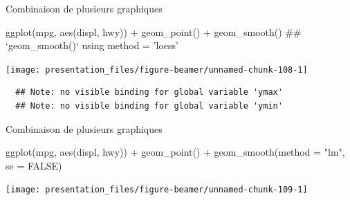 \documentclass[12pt,ignorenonframetext,handout,]{beamer}
\newenvironment{Shaded}{}{}
\newcommand{\DataTypeTok}[1]{#1}
\newcommand{\KeywordTok}[1]{\textcolor[rgb]{0.00,0.00,1.00}{#1}}
\newcommand{\NormalTok}[1]{#1}
\newcommand{\OperatorTok}[1]{#1}
\newcommand{\OtherTok}[1]{\textcolor[rgb]{1.00,0.25,0.00}{#1}}
\newcommand{\StringTok}[1]{\textcolor[rgb]{0.00,0.50,0.50}{#1}}
\renewenvironment{Shaded}{\begin{snugshade}}{\end{snugshade}}
\begin{document}
\begin{frame}[fragile]{Combinaison de plusieurs graphiques}
\protect\hypertarget{combinaison-de-plusieurs-graphiques-2}{}

\footnotesize \center

\begin{Shaded}
\begin{Highlighting}[]
\KeywordTok{ggplot}\NormalTok{(mpg, }\KeywordTok{aes}\NormalTok{(displ, hwy)) }\OperatorTok{+}
\StringTok{  }\KeywordTok{geom_point}\NormalTok{() }\OperatorTok{+}\StringTok{ }\KeywordTok{geom_smooth}\NormalTok{()}
\NormalTok{  ## `geom_smooth()` using method = 'loess'}
\end{Highlighting}
\end{Shaded}

\texttt{[image: presentation\_files/figure-beamer/unnamed-chunk-108-1]}

\begin{verbatim}
  ## Note: no visible binding for global variable 'ymax' 
  ## Note: no visible binding for global variable 'ymin'
\end{verbatim}

\end{frame}

\begin{frame}[fragile]{Combinaison de plusieurs graphiques}
\protect\hypertarget{combinaison-de-plusieurs-graphiques-3}{}

\footnotesize \center

\begin{Shaded}
\begin{Highlighting}[]
\KeywordTok{ggplot}\NormalTok{(mpg, }\KeywordTok{aes}\NormalTok{(displ, hwy)) }\OperatorTok{+}
\StringTok{  }\KeywordTok{geom_point}\NormalTok{() }\OperatorTok{+}\StringTok{ }\KeywordTok{geom_smooth}\NormalTok{(}\DataTypeTok{method =} \StringTok{"lm"}\NormalTok{, }\DataTypeTok{se =} \OtherTok{FALSE}\NormalTok{)}
\end{Highlighting}
\end{Shaded}

\texttt{[image: presentation\_files/figure-beamer/unnamed-chunk-109-1]}

\end{frame}
\end{document}
